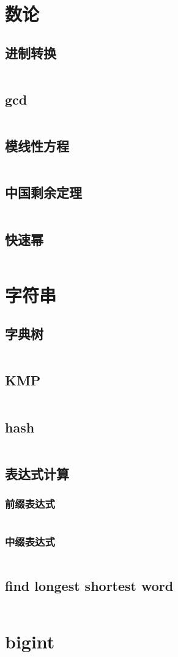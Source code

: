 \documentclass[a4paper,11pt]{article}
\begin{document}
\section{数论}
\subsection{进制转换}
\inputminted[breaklines]{c++}{number_theory/base_conversion.cpp}
\subsection{gcd}
\inputminted[breaklines]{c++}{number_theory/gcd.cpp}
\subsection{模线性方程}
\inputminted[breaklines]{c++}{number_theory/modequ.cpp}

\subsection{中国剩余定理}
\inputminted[breaklines]{c++}{number_theory/china.cpp}
\subsection{快速幂}
\inputminted[breaklines]{c++}{number_theory/pow_mod.cpp}





\section{字符串}
\subsection{字典树}
\inputminted[breaklines]{c++}{string/trie.cpp}
\subsection{KMP}
\inputminted[breaklines]{c++}{string/kmp.cpp}
\subsection{hash}
\inputminted[breaklines]{c++}{string/hash.cpp}
\subsection{表达式计算}
\subsubsection{前缀表达式}
\inputminted[breaklines]{c++}{string/pre_expr.cpp}

\subsubsection{中缀表达式}
\inputminted[breaklines]{c++}{string/post_expr.cpp}
\subsection{find longest shortest word}
\inputminted[breaklines]{c++}{string/find_longest_shortest_word.cpp}

\section{bigint}
\inputminted[breaklines]{c++}{bigint/bigint.cpp}
\end{document}
